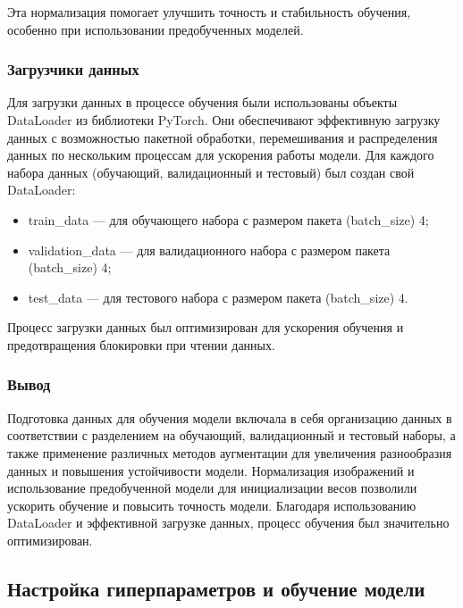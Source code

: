 {    Эта нормализация помогает улучшить точность и стабильность обучения, особенно при использовании предобученных моделей.

    \subsubsection*{Загрузчики данных}

    Для загрузки данных в процессе обучения были использованы объекты DataLoader из библиотеки PyTorch. Они обеспечивают эффективную загрузку данных с возможностью пакетной обработки, перемешивания и распределения данных по нескольким процессам для ускорения работы модели. Для каждого набора данных (обучающий, валидационный и тестовый) был создан свой DataLoader:
    \begin{itemize}
        \item train\_data — для обучающего набора с размером пакета (batch\_size) 4;
        \item validation\_data — для валидационного набора с размером пакета  (batch\_size) 4;
        \item test\_data — для тестового набора с размером пакета (batch\_size) 4.
    \end{itemize}

    Процесс загрузки данных был оптимизирован для ускорения обучения и предотвращения блокировки при чтении данных.

    \subsubsection*{Вывод}

    Подготовка данных для обучения модели включала в себя организацию данных в соответствии с разделением на обучающий, валидационный и тестовый наборы, а также применение различных методов аугментации для увеличения разнообразия данных и повышения устойчивости модели. Нормализация изображений и использование предобученной модели для инициализации весов позволили ускорить обучение и повысить точность модели. Благодаря использованию DataLoader и эффективной загрузке данных, процесс обучения был значительно оптимизирован.

    \vspace{13pt}
    \subsection{Настройка гиперпараметров и обучение модели}

}
